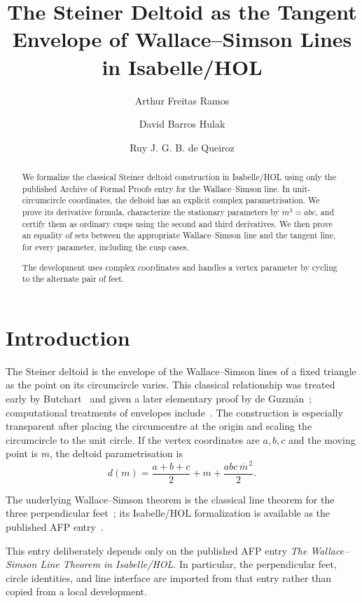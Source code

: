 \documentclass[11pt,a4paper]{article}
\begin{document}
\title{The Steiner Deltoid as the Tangent Envelope of Wallace--Simson Lines in Isabelle/HOL}
\author{Arthur Freitas Ramos \and David Barros Hulak \and Ruy J. G. B. de Queiroz}
\maketitle

\begin{abstract}
We formalize the classical Steiner deltoid construction in Isabelle/HOL using
only the published Archive of Formal Proofs entry for the Wallace--Simson line.
In unit-circumcircle coordinates, the deltoid has an explicit complex
parametrisation.  We prove its derivative formula, characterize the stationary
parameters by \(m^3=abc\), and certify them as ordinary cusps using the
second and third derivatives.  We then prove an equality of sets between the
appropriate Wallace--Simson line and the tangent line, for every parameter,
including the cusp cases.

The development uses complex coordinates and handles a vertex parameter by
cycling to the alternate pair of feet.
\end{abstract}

\tableofcontents

\section{Introduction}

The Steiner deltoid is the envelope of the Wallace--Simson lines of a fixed
triangle as the point on its circumcircle varies.  This classical relationship
was treated early by Butchart~\cite{butchart1939} and given a later elementary
proof by de Guzm{\'a}n~\cite{deguzman2001}; computational treatments of
envelopes include~\cite{botana2004}.  The construction is especially
transparent after placing the circumcentre at the origin and scaling the
circumcircle to the unit circle.  If the vertex coordinates are
$a,b,c$ and the moving point is $m$, the deltoid parametrisation is
\[
  d(m) = \frac{a+b+c}{2} + m + \frac{abc\,\overline m^{\,2}}{2}.
\]

The underlying Wallace--Simson theorem is the classical line theorem for the
three perpendicular feet~\cite{wallace1798,coxeter1967}; its Isabelle/HOL
formalization is available as the published AFP entry~\cite{simson-afp}.

This entry deliberately depends only on the published AFP entry
\emph{The Wallace--Simson Line Theorem in Isabelle/HOL}.  In particular, the
perpendicular feet, circle identities, and line interface are imported from
that entry rather than copied from a local development.
\end{document}
